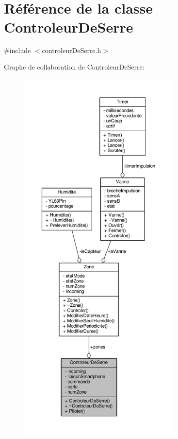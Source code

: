 \hypertarget{class_controleur_de_serre}{}\section{Référence de la classe Controleur\+De\+Serre}
\label{class_controleur_de_serre}


{\ttfamily \#include $<$controleur\+De\+Serre.\+h$>$}



Graphe de collaboration de Controleur\+De\+Serre\+:\nopagebreak
\begin{figure}[H]
\begin{center}
\leavevmode
\includegraphics[height=550pt]{class_controleur_de_serre__coll__graph}
\end{center}
\end{figure}
